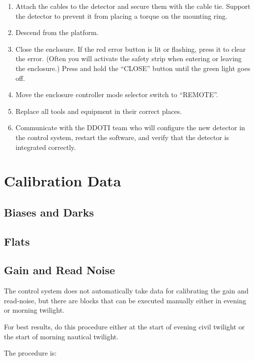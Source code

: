 \begin{enumerate}
\item Attach the cables to the detector and secure them with the cable tie. Support the detector to prevent it from placing a torque on the mounting ring.

\item Descend from the platform.

\item Close the enclosure. If the red error button is lit or flashing, press it to clear the error. (Often you will activate the safety strip when entering or leaving the enclosure.) Press and hold the “CLOSE” button until the green light goes off.

\item 
Move the enclosure controller mode selector switch to “REMOTE”.

\item
Replace all tools and equipment in their correct places.

\item Communicate with the DDOTI team who will configure the new detector in the control system, restart the software, and verify that the detector is integrated correctly.
\end{enumerate}

\section{Calibration Data}

\subsection{Biases and Darks}

\subsection{Flats}

\subsection{Gain and Read Noise}

The control system does not automatically take data for calibrating the gain and read-noise, but there are blocks that can be executed manually either in evening or morning twilight. 

For best results, do this procedure either at the start of evening civil twilight or the start of morning nautical twilight.

The procedure is:

